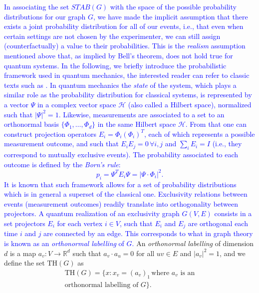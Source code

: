 \documentclass[letterpaper]{article}
\newcommand{\abs}[1]{\left|#1\right|}
\newcommand{\Real}{\mathbb{R}}
\renewcommand{\TH}{\mathrm{TH}}
\begin{document}
\textcolor{blue}{
In associating the set $STAB(G)$ with the space of the possible probability distributions for our graph $G$, we have made the implicit
assumption that there exists a joint probability distribution for all
of our events, i.e., that even when certain settings are not chosen by
the experimenter, we can still assign (counterfactually) a value to their probabilities.
This is the \emph{realism} assumption mentioned above that, as implied by Bell's theorem, does not hold true for quantum systems.
In the following, we briefly introduce the probabilistic framework used
in quantum mechanics, the interested reader can refer to classic texts such as \cite{nielsen_chuang}.
In quantum mechanics the \emph{state} of the system, which plays a similar role as the probability distribution for classical systems,
is represented by a vector $\Psi$ in a complex vector space
$\mathcal{H}$ (also called a Hilbert space), normalized such that $\abs{\Psi}^2 = 1$.
Likewise, measurements are associated to a set to an orthonormal basis
$\{\Phi_1,\ldots,\Phi_d\}$ in the same Hilbert space $\mathcal{H}$. From that one can construct projection operators $E_i = \Phi_i (\Phi_i)^T$, each of which represents a possible measurement outcome, and such that $E_i E_j = 0 \, \forall i,j$ and $\sum_i E_i = I$ (i.e., they correspond to mutually exclusive events). The probability associated to each outcome is defined by the \emph{Born's rule}:
\begin{equation}
    p_i = \Psi^T E_i \Psi = \abs{\Psi \cdot \Phi_i}^2.
\end{equation}
It is known that such framework allows for a set of probability distributions which
is in general a superset of the classical one.
}\textcolor{blue}{Exclusivity relations between events (measurement outcomes) readily translate into orthogonality between projectors.
A quantum realization of an exclusivity graph $G(V,E)$ consists in 
a set projectors $E_i$ for each vertex $i \in V$, such that $E_i$ and $E_j$ are
orthogonal each time $i$ and $j$ are connected by an edge. This corresponds to what in graph theory is known as an \emph{orthonormal labelling} of $G$. 
}
An \emph{orthonormal labelling} of dimension $d$ is a map
$a_v:V \rightarrow \Real^d$ such that $a_v \cdot a_u = 0$ for all $uv \in E$ and
$|a_v|^2 = 1$, and we define the set $\TH(G)$ as
\begin{multline}
    \TH(G) = \{x: x_v = (a_v)_1 \, \text{where $a_v$ is an} \\ \text{orthonormal labelling of $G$}\}.
    \label{eq:thbody}
\end{multline}
\end{document}
